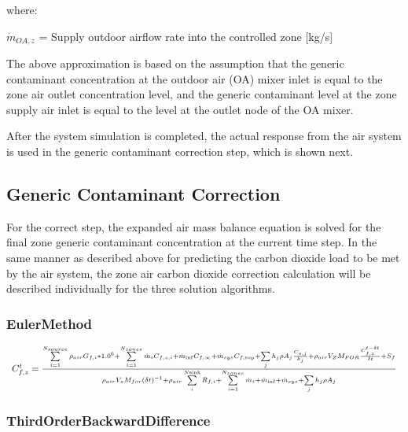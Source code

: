 where:

\({\dot m_{OA,z}}\) = Supply outdoor airflow rate into the controlled zone {[}kg/s{]}

The above approximation is based on the assumption that the generic contaminant concentration at the outdoor air (OA) mixer inlet is equal to the zone air outlet concentration level, and the generic contaminant level at the zone supply air inlet is equal to the level at the outlet node of the OA mixer.

After the system simulation is completed, the actual response from the air system is used in the generic contaminant correction step, which is shown next.

\subsection{Generic Contaminant Correction}\label{generic-contaminant-correction}

For the correct step, the expanded air mass balance equation is solved for the final zone generic contaminant concentration at the current time step. In the same manner as described above for predicting the carbon dioxide load to be met by the air system, the zone air carbon dioxide correction calculation will be described individually for the three solution algorithms.

\subsubsection{EulerMethod}\label{eulermethod-1-000}

\begin{equation}
\begin{array}{l}C_{f,z}^t = \frac{{\sum\limits_{i = 1}^{{N_{source}}} {{\rho_{air}}{G_{f,i}}*{{1.0}^6}}  + \sum\limits_{i = 1}^{{N_{zones}}} {{{\dot m}_i}{C_{f,z,i}}}  + {{\dot m}_{\inf }}{C_{f,\infty }} + {{\dot m}_{sys}}{C_{f,\sup }} + \sum\limits_j {{h_j}\rho {A_j}\frac{{{C_{s,j}}}}{{{k_j}}} + {\rho_{air}}{V_Z}{M_{FOR}}\frac{{C_{f,z}^{t - \delta t}}}{{\delta t}} + {S_f}} }}{{{\rho_{air}}{V_z}{M_{for}}{{\left( {\delta t} \right)}^{ - 1}} + {\rho_{air}}\sum\limits_i^{N{\rm{sink}}} {{R_{f,i}}}  + \sum\limits_{i = 1}^{{N_{zones}}} {{{\dot m}_i}}  + {{\dot m}_{\inf }} + {{\dot m}_{sys}} + \sum\limits_j {{h_j}\rho {A_j}} }}\\\end{array}
\end{equation}

\subsubsection{ThirdOrderBackwardDifference}\label{thirdorderbackwarddifference-1-000}

